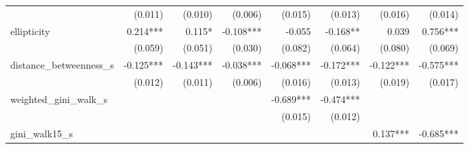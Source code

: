 \begin{tabular}{lrrrrrrr}
                         &                      (0.011) &                    (0.010) &                      (0.006) &                      (0.015) &                    (0.013) &                                             (0.016) &                                             (0.014) \\ 
ellipticity              &                     0.214*** &                     0.115* &                    -0.108*** &                       -0.055 &                   -0.168** &                                               0.039 &                                            0.756*** \\ 
                         &                      (0.059) &                    (0.051) &                      (0.030) &                      (0.082) &                    (0.064) &                                             (0.080) &                                             (0.069) \\ 
distance\_betweenness\_s &                    -0.125*** &                  -0.143*** &                    -0.038*** &                    -0.068*** &                  -0.172*** &                                           -0.122*** &                                           -0.575*** \\ 
                         &                      (0.012) &                    (0.011) &                      (0.006) &                      (0.016) &                    (0.013) &                                             (0.019) &                                             (0.017) \\ 
weighted\_gini\_walk\_s  &                              &                            &                              &                    -0.689*** &                  -0.474*** &                                                     &                                                     \\ 
                         &                              &                            &                              &                      (0.015) &                    (0.012) &                                                     &                                                     \\ 
gini\_walk15\_s          &                              &                            &                              &                              &                            &                                            0.137*** &                                           -0.685*** \\ 

\end{tabular}

